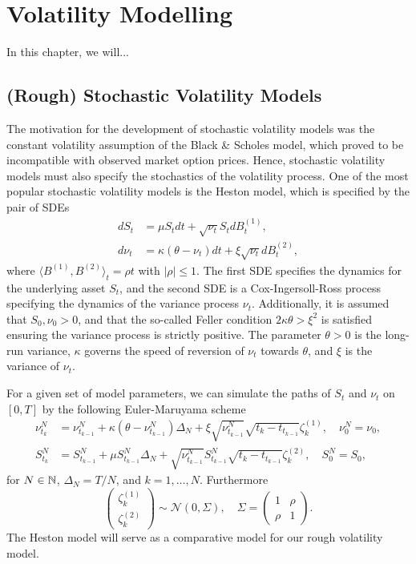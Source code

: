 \chapter{Volatility Modelling}
In this chapter, we will...
\section{(Rough) Stochastic Volatility Models}
The motivation for the development of stochastic volatility models was the constant volatility assumption of the Black \& Scholes model, which proved to be incompatible with observed market option prices. Hence, stochastic volatility models must also specify the stochastics of the volatility process. One of the most popular stochastic volatility models is the Heston model, which is specified by the pair of SDEs
\begin{align}
    dS_{t}&= \mu S_{t}dt + \sqrt{\nu_{t}}S_{t}dB_{t}^{(1)},\\
    d\nu_{t}&= \kappa(\theta - \nu_{t})dt + \xi\sqrt{\nu_{t}}dB_{t}^{(2)},
\end{align}
where $\langle B^{(1)},B^{(2)}\rangle_{t}=\rho t$ with $|\rho|\leq 1$. The first SDE specifies the dynamics for the underlying asset $S_{t}$, and the second SDE is a Cox-Ingersoll-Ross process specifying the dynamics of the variance process $\nu_{t}$. Additionally, it is assumed that $S_{0},\nu_{0}>0$, and that the so-called Feller condition $2\kappa\theta >\xi^{2}$ is satisfied ensuring the variance process is strictly positive. The parameter $\theta>0$ is the long-run variance, $\kappa$ governs the speed of reversion of $\nu_{t}$ towards $\theta$, and $\xi$ is the variance of $\nu_{t}$.

For a given set of model parameters, we can simulate the paths of $S_{t}$ and $\nu_{t}$ on $[0,T]$ by the following Euler-Maruyama scheme
\begin{align}
    \nu_{t_{k}}^{N}&= \nu_{t_{k-1}}^{N} + \kappa(\theta-\nu_{t_{k-1}}^{N})\Delta_{N} + \xi\sqrt{\nu_{t_{k-1}}^{N}}\sqrt{t_{k}-t_{t_{k-1}}}\zeta_{k}^{(1)}, \quad \nu_{0}^{N}=\nu_{0},\\
    S_{t_{k}}^{N}&= S_{t_{k-1}}^{N} + \mu S_{t_{k-1}}^{N}\Delta_{N} + \sqrt{\nu_{t_{k-1}}^{N}}S_{t_{k-1}}^{N}\sqrt{t_{k}-t_{t_{k-1}}}\zeta_{k}^{(2)}, \quad S_{0}^{N}=S_{0},
\end{align}
for $N\in\mathbb{N}$, $\Delta_{N}=T/N$, and $k=1,\dots,N$. Furthermore
\begin{equation}
    \begin{pmatrix}
        \zeta_{k}^{(1)}\\
        \zeta_{k}^{(2)}
    \end{pmatrix} \sim \mathcal{N}(0,\Sigma),\quad \Sigma = \begin{pmatrix}
        1 & \rho \\
        \rho & 1
    \end{pmatrix}.
\end{equation}
The Heston model will serve as a comparative model for our rough volatility model.
